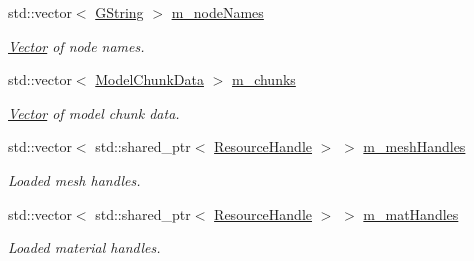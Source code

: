 \begin{Indent}
\begin{DoxyCompactItemize}
\mbox{\label{classrev_1_1_model_reader_aed6bb03ed4361fc472c16bb71b399d53}} 
std\+::vector$<$ \mbox{\hyperlink{classrev_1_1_g_string}{G\+String}} $>$ \mbox{\hyperlink{classrev_1_1_model_reader_aed6bb03ed4361fc472c16bb71b399d53}{m\+\_\+node\+Names}}
\begin{DoxyCompactList}\small\item\em \mbox{\hyperlink{classrev_1_1_vector}{Vector}} of node names. \end{DoxyCompactList}\item 
\mbox{\label{classrev_1_1_model_reader_a37b10c7b687e3325529a9f667aeb3f2a}} 
std\+::vector$<$ \mbox{\hyperlink{structrev_1_1_model_chunk_data}{Model\+Chunk\+Data}} $>$ \mbox{\hyperlink{classrev_1_1_model_reader_a37b10c7b687e3325529a9f667aeb3f2a}{m\+\_\+chunks}}
\begin{DoxyCompactList}\small\item\em \mbox{\hyperlink{classrev_1_1_vector}{Vector}} of model chunk data. \end{DoxyCompactList}\item 
\mbox{\label{classrev_1_1_model_reader_a10784912ad5d7d63e9e5564442b34339}} 
std\+::vector$<$ std\+::shared\+\_\+ptr$<$ \mbox{\hyperlink{classrev_1_1_resource_handle}{Resource\+Handle}} $>$ $>$ \mbox{\hyperlink{classrev_1_1_model_reader_a10784912ad5d7d63e9e5564442b34339}{m\+\_\+mesh\+Handles}}
\begin{DoxyCompactList}\small\item\em Loaded mesh handles. \end{DoxyCompactList}\item 
\mbox{\label{classrev_1_1_model_reader_a876c2caef51445a3243855a8d46182b4}} 
std\+::vector$<$ std\+::shared\+\_\+ptr$<$ \mbox{\hyperlink{classrev_1_1_resource_handle}{Resource\+Handle}} $>$ $>$ \mbox{\hyperlink{classrev_1_1_model_reader_a876c2caef51445a3243855a8d46182b4}{m\+\_\+mat\+Handles}}
\begin{DoxyCompactList}\small\item\em Loaded material handles. \end{DoxyCompactList}\item 
\mbox{\label{classrev_1_1_model_reader_a782e5007156de58fd6b8bb4dad1ea8d3}} 

\end{DoxyCompactItemize}
\end{Indent}
